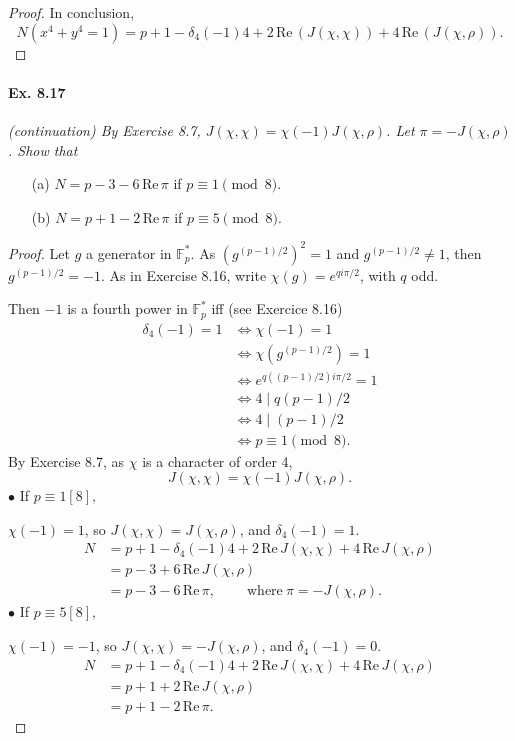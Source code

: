 \documentclass[11pt,a4paper]{article}
\newcommand{\F}{\mathbb{F}}
\newcommand{\re}{\,\mathrm{Re}\,}
\begin{document}
{\begin{proof}
In conclusion,
 $$N(x^4+y^4=1) = p+1- \delta_4(-1)4+ 2 \,\mathrm{Re}\,( J (\chi,\chi))+4\,\mathrm{Re}\,(J(\chi,\rho)).$$
\end{proof}

\paragraph{Ex. 8.17}

{\it (continuation) By Exercise 8.7, $J(\chi,\chi) = \chi(-1) J(\chi,\rho)$. Let $\pi = -J(\chi,\rho)$. Show that
\begin{enumerate}
\item[(a)] $N = p-3 - 6\,\mathrm{Re}\, \pi$ if $p\equiv 1 \pmod 8$.
\item[(b)] $N = p+1 - 2 \,\mathrm{Re}\,  \pi$ if $p \equiv 5 \pmod 8$.
\end{enumerate}
}

\begin{proof}
Let $g$ a generator in  $\mathbb{F}_p^*$. As $(g^{(p-1)/2})^2=1$ and $g^{(p-1)/2} \neq 1$, then $g^{(p-1)/2} = -1$.
As in Exercise 8.16, write $\chi(g) = e^{q i\pi/2}$, with $q$ odd.

Then $-1$ is a fourth power in $\F_p^*$ iff (see Exercice 8.16)
\begin{align*}
\delta_4(-1) = 1 &\iff \chi(-1)=1\\
&\iff \chi(g^{(p-1)/2}) = 1\\
&\iff e^{q ((p-1)/2 )i\pi/2} = 1\\
&\iff  4 \mid q(p-1)/2\\
&\iff 4 \mid (p-1)/2\\
&\iff p\equiv 1 \pmod 8.
\end{align*}
By Exercise 8.7, as $\chi$ is a character of order 4,
$$J(\chi,\chi) = \chi(-1) J(\chi,\rho).$$
$\bullet$ If $p\equiv 1 [8],$

$\chi(-1) = 1$, so $J(\chi,\chi) = J(\chi,\rho)$, and $\delta_4(-1) = 1$.
\begin{align*}
N &= p+1 - \delta_4(-1) 4 + 2 \re J(\chi,\chi)  + 4 \re J(\chi,\rho)\\
&=p-3+6 \re J(\chi,\rho)\\
 &= p-3-6\re \pi,\qquad  \ \mathrm{where}\ \pi = -J(\chi,\rho).
\end{align*}
$\bullet$ If $p\equiv 5 [8],$

$\chi(-1) = -1$, so $J(\chi,\chi) = -J(\chi,\rho)$, and $\delta_4(-1) = 0$.
\begin{align*}
N &= p+1 - \delta_4(-1) 4 + 2 \re J(\chi,\chi)  + 4 \re J(\chi,\rho)\\
&= p+1 + 2 \re J(\chi,\rho)\\
 &= p+1 - 2 \re \pi.
\end{align*}
\end{proof}

}
\end{document}

